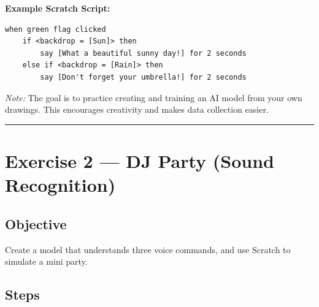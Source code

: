 \documentclass[12pt,a4paper]{article}
\begin{document}
\vspace{0.3cm}
\noindent\textbf{Example Scratch Script:}

\begin{lstlisting}
when green flag clicked
    if <backdrop = [Sun]> then
        say [What a beautiful sunny day!] for 2 seconds
    else if <backdrop = [Rain]> then
        say [Don't forget your umbrella!] for 2 seconds
\end{lstlisting}

\vspace{0.3cm}
\textit{Note:}  
The goal is to practice creating and training an AI model from your own drawings. This encourages creativity and makes data collection easier.

\noindent\rule{\linewidth}{0.4pt}

\section*{Exercise 2 — DJ Party (Sound Recognition)}

\subsection*{Objective}
Create a model that understands three voice commands, and use Scratch to simulate a mini party.

\subsection*{Steps}
\end{document}

